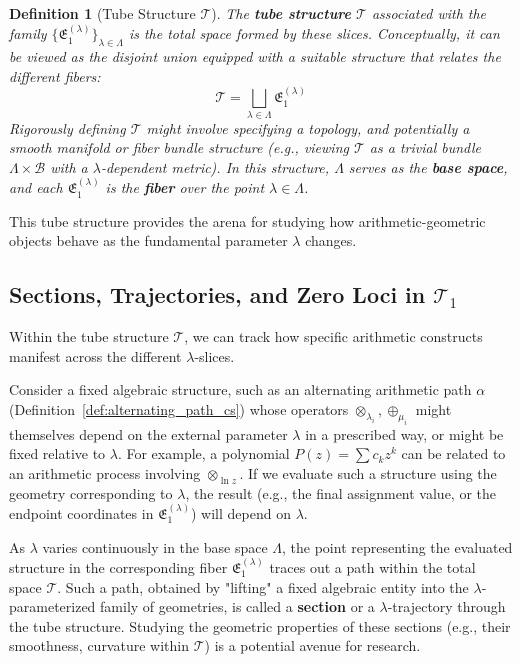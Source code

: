 \documentclass[12pt]{article}
\newtheorem{definition}{Definition}[section]
\begin{document}
\begin{definition}[Tube Structure \( \mathcal{T} \)]\label{def:tube_structure_cs}
The \textbf{tube structure} \( \mathcal{T} \) associated with the family \( \{ \mathfrak{E}_1^{(\lambda)} \}_{\lambda \in \Lambda} \) is the total space formed by these slices. Conceptually, it can be viewed as the disjoint union equipped with a suitable structure that relates the different fibers:
\[
\mathcal{T} = \bigsqcup_{\lambda \in \Lambda} \mathfrak{E}_1^{(\lambda)}
\]
Rigorously defining \( \mathcal{T} \) might involve specifying a topology, and potentially a smooth manifold or fiber bundle structure (e.g., viewing \( \mathcal{T} \) as a trivial bundle \( \Lambda \times \mathcal{B} \) with a \( \lambda \)-dependent metric). In this structure, \( \Lambda \) serves as the \textbf{base space}, and each \( \mathfrak{E}_1^{(\lambda)} \) is the \textbf{fiber} over the point \( \lambda \in \Lambda \).
\end{definition}

This tube structure provides the arena for studying how arithmetic-geometric objects behave as the fundamental parameter \( \lambda \) changes.

\subsection{Sections, Trajectories, and Zero Loci in \( \mathcal{T}_1 \)} %

Within the tube structure \( \mathcal{T} \), we can track how specific arithmetic constructs manifest across the different \( \lambda \)-slices.

Consider a fixed algebraic structure, such as an alternating arithmetic path \( \alpha \) (Definition~\ref{def:alternating_path_cs}) whose operators \( \otimes_{\lambda_i}, \oplus_{\mu_i} \) might themselves depend on the external parameter \( \lambda \) in a prescribed way, or might be fixed relative to \( \lambda \). For example, a polynomial \( P(z) = \sum c_k z^k \) can be related to an arithmetic process involving \( \otimes_{\ln z} \). If we evaluate such a structure using the geometry corresponding to \( \lambda \), the result (e.g., the final assignment value, or the endpoint coordinates in \( \mathfrak{E}_1^{(\lambda)} \)) will depend on \( \lambda \).

As \( \lambda \) varies continuously in the base space \( \Lambda \), the point representing the evaluated structure in the corresponding fiber \( \mathfrak{E}_1^{(\lambda)} \) traces out a path within the total space \( \mathcal{T} \). Such a path, obtained by "lifting" a fixed algebraic entity into the \( \lambda \)-parameterized family of geometries, is called a \textbf{section} or a \( \lambda \)-trajectory through the tube structure. Studying the geometric properties of these sections (e.g., their smoothness, curvature within \( \mathcal{T} \)) is a potential avenue for research.
\end{document}
